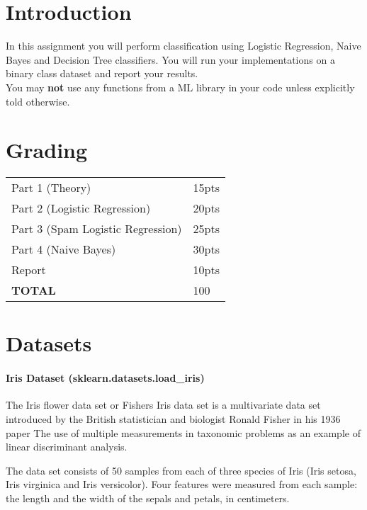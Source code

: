 \documentclass[12pt]{article}
\begin{document}
\maketitle


\section*{Introduction}
In this assignment you will perform classification using Logistic Regression, Naive Bayes and Decision Tree classifiers.  You will run your implementations on  a binary class dataset and report your results.\\

\noindent
You may \textbf{not} use any functions from a ML library in your code unless explicitly told otherwise.  

\section*{Grading}
\begin{table}[h]
\begin{center}
\begin{tabular}{|l|l|}
\hline
Part 1 (Theory) & 15pts \\
Part 2 (Logistic Regression) & 20pts\\
Part 3 (Spam Logistic Regression) & 25pts\\
Part 4 (Naive Bayes) & 30pts\\
Report & 10pts\\
\hline
\textbf{TOTAL} & 100\\
\hline
\end{tabular}
\end{center}
\end{table}

\newpage
\section*{Datasets}
\paragraph{Iris Dataset  (sklearn.datasets.load\_iris)}
The Iris flower data set or Fishers Iris data set is a multivariate data set introduced by the British statistician and biologist Ronald Fisher in his 1936 paper The use of multiple measurements in taxonomic problems as an example of linear discriminant analysis.

The data set consists of 50 samples from each of three species of Iris (Iris setosa, Iris virginica and Iris versicolor). Four features were measured from each sample: the length and the width of the sepals and petals, in centimeters.
\end{document}

